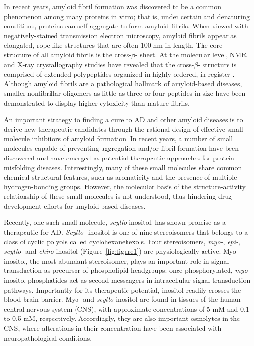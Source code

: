 In recent years, amyloid fibril formation was discovered to be a common phenomenon among many proteins in vitro; that is, under certain and denaturing conditions, proteins can self-aggregate to form amyloid fibrils.\cite{Chiti:2006p20} When viewed with negatively-stained transmission electron microscopy, amyloid fibrils appear as elongated, rope-like structures that are often 100 nm in length.\cite{Chiti:2006p20} The core structure of all amyloid fibrils is the cross-$\beta$- sheet.\cite{Chiti:2006p20,Serpell:2000p39} At the molecular level, NMR\cite{Balbach:2000p49,Petkova:2006p48} and X-ray crystallography\cite{Sawaya:2007p11} studies have revealed that the cross-$\beta$- structure is comprised of extended polypeptides organized in highly-ordered, in-register \bsheets. Although amyloid fibrils are a pathological hallmark of amyloid-based diseases, smaller nonfibrillar oligomers as little as three or four peptides in size have been demonstrated to display higher cytoxicity than mature fibrils.\cite{Gong:2003p22,Bitan:2003p10,Caughey:2009p5,Keshet:2010p61,Kitamura:2010p6,Lambert:1998p60,Selkoe:2008p16}

An important strategy to finding a cure to AD and other amyloid diseases is to derive new therapeutic candidates through the rational design of effective small-molecule inhibitors of amyloid formation. In recent years, a number of small molecules capable of preventing aggregation and/or fibril formation have been discovered and have emerged as potential therapeutic approaches for protein misfolding diseases.\cite{Frid:2007p65,Hawkes:2009p9,LeVine:2009p38,Necula:2007p42,ScherzerAttali:2010p63,Sood:2009p14} Interestingly, many of these small molecules share common chemical structural features, such as aromaticity and the presence of multiple hydrogen-bonding groups.\cite{Ehrnhoefer:2008p8,Liu:2009p18,Liu:2005p7,Porat:2006p33} However, the molecular basis of the structure-activity relationship of these small molecules is not understood, thus hindering drug development efforts for amyloid-based diseases.

Recently, one such small molecule, \textit{scyllo-}inositol, has shown promise as a therapeutic for AD.\cite{McLaurin:2006p29,McLaurin:2000p64} \textit{Scyllo-}-inositol is one of nine stereoisomers that belongs to a class of cyclic polyols called cyclohexanehexols. Four stereoisomers, \textit{myo-}, \textit{epi-}, \textit{scyllo-} and \textit{chiro-}inositol (Figure~\ref{fig:figure1}) are physiologically active.\cite{Fisher:2002p62} Myo-inositol, the most abundant stereoisomer, plays an important role in signal transduction as precursor of phospholipid headgroups: once phosphorylated, \textit{myo-}inositol phosphatides act as second messengers in intracellular signal transduction pathways.\cite{Fisher:2002p62} Importantly for its therapeutic potential, inositol readily crosses the blood-brain barrier. Myo- and \textit{scyllo-}inositol are found in tissues of the human central nervous system (CNS), with approximate concentrations of 5 mM and 0.1 to 0.5 mM, respectively.\cite{Michaelis:1993p89} Accordingly, they are also important osmolytes in the CNS, where alterations in their concentration have been associated with neuropathological conditions.\cite{Fisher:2002p62,Michell:2008p4}
 
